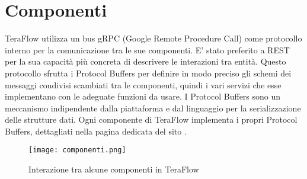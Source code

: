 \section{Componenti}
TeraFlow utilizza un bus gRPC (Google Remote Procedure Call) come protocollo interno per la 
comunicazione tra le sue componenti. E' stato preferito a REST per la sua capacità più concreta di descrivere le interazioni tra entità.
Questo protocollo sfrutta i Protocol Buffers per definire in modo preciso gli schemi dei messaggi condivisi scambiati tra le componenti, quindi i vari servizi che esse implementano con le adeguate funzioni da usare.
I Protocol Buffers sono un meccanismo indipendente dalla piattaforma e dal linguaggio per la serializzazione delle strutture dati. Ogni componente di TeraFlow implementa i propri 
Protocol Buffers, dettagliati nella pagina dedicata del sito \cite{ProtoBuf}.
\begin{figure}[h]
    \centering
   \texttt{[image: componenti.png]}
    \caption{Interazione tra alcune componenti in TeraFlow}
    \label{fig:p4}
\end{figure}

